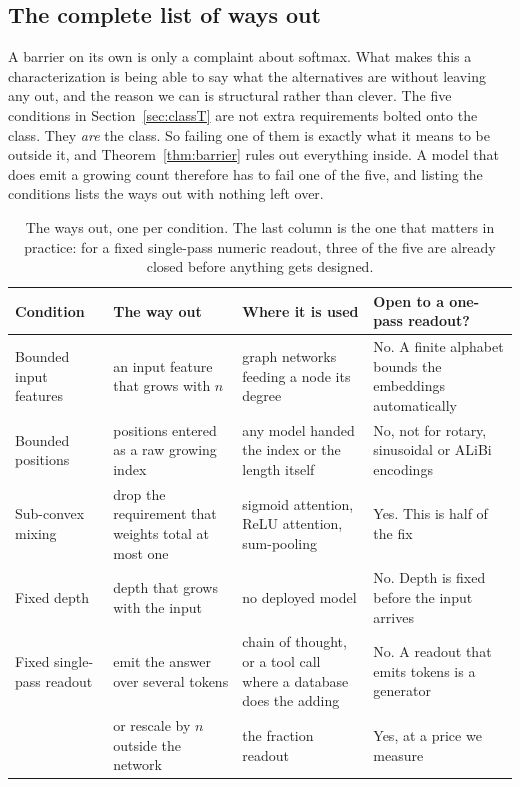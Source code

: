 \documentclass[10pt]{article}
\theoremstyle{definition}
\begin{document}
\subsection{The complete list of ways out}
\label{sec:escapes-list}

A barrier on its own is only a complaint about softmax. What makes this a
characterization is being able to say what the alternatives are without
leaving any out, and the reason we can is structural rather than clever. The
five conditions in Section~\ref{sec:classT} are not extra requirements
bolted onto the class. They \emph{are} the class. So failing one of them is
exactly what it means to be outside it, and Theorem~\ref{thm:barrier} rules
out everything inside. A model that does emit a growing count therefore has
to fail one of the five, and listing the conditions lists the ways out with
nothing left over.

\begin{table}[htbp]
\centering
\caption{The ways out, one per condition. The last column is the one that
matters in practice: for a fixed single-pass numeric readout, three of the
five are already closed before anything gets designed.}
\label{tab:escapes}
\small
\begin{tabular}{@{}p{2.5cm}p{3.6cm}p{3.3cm}p{3.6cm}@{}}
\toprule
\textbf{Condition} & \textbf{The way out} & \textbf{Where it is used} & \textbf{Open to a one-pass readout?} \\
\midrule
Bounded input features & an input feature that grows with $n$ & graph networks feeding a node its degree & No. A finite alphabet bounds the embeddings automatically \\
\addlinespace
Bounded positions & positions entered as a raw growing index & any model handed the index or the length itself & No, not for rotary, sinusoidal or ALiBi encodings \\
\addlinespace
Sub-convex mixing & drop the requirement that weights total at most one & sigmoid attention, ReLU attention, sum-pooling & Yes. This is half of the fix \\
\addlinespace
Fixed depth & depth that grows with the input & no deployed model & No. Depth is fixed before the input arrives \\
\addlinespace
Fixed single-pass readout & emit the answer over several tokens & chain of thought, or a tool call where a database does the adding & No. A readout that emits tokens is a generator \\
\addlinespace
 & or rescale by $n$ outside the network & the fraction readout & Yes, at a price we measure \\
\bottomrule
\end{tabular}
\end{table}
\end{document}
